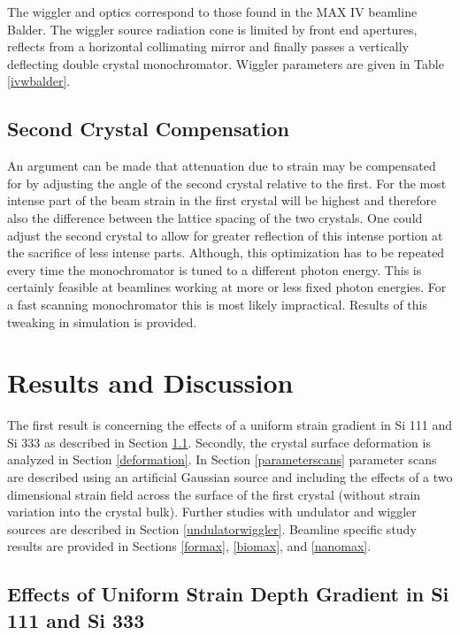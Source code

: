 \documentclass[preprint]{iucr}              %
\begin{document}
The wiggler and optics correspond to those found in the MAX IV beamline Balder. The wiggler source radiation cone is limited by front end apertures, reflects from a horizontal collimating mirror and finally passes a vertically deflecting double crystal monochromator. Wiggler parameters are given in Table \ref{ivwbalder}.

\subsection{Second Crystal Compensation}

An argument can be made that attenuation due to strain may be compensated for by adjusting the angle of the second crystal relative to the first. For the most intense part of the beam strain in the first crystal will be highest and therefore also the difference between the lattice spacing of the two crystals. One could adjust the second crystal to allow for greater reflection of this intense portion at the sacrifice of less intense parts. Although, this optimization has to be repeated every time the monochromator is tuned to a different photon energy. This is certainly feasible at beamlines working at more or less fixed photon energies. For a fast scanning monochromator this is most likely impractical. Results of this tweaking in simulation is provided.
\section{Results and Discussion}

The first result is concerning the effects of a uniform strain gradient in Si 111 and Si 333 as described in Section \ref{strain_results}. Secondly, the crystal surface deformation is analyzed in Section \ref{deformation}. In Section \ref{parameterscans} parameter scans are described using an artificial Gaussian source and including the effects of a two dimensional strain field across the surface of the first crystal (without strain variation into the crystal bulk). Further studies with undulator and wiggler sources are described in Section \ref{undulatorwiggler}. Beamline specific study results are provided in Sections \ref{formax}, \ref{biomax}, and \ref{nanomax}.

\subsection{Effects of Uniform Strain Depth Gradient in Si 111 and Si 333}\label{strain_results}
\end{document}
